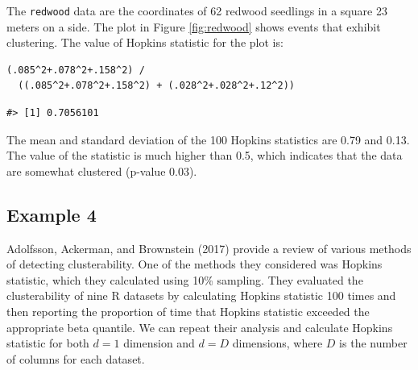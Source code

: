 The \texttt{redwood} data are the coordinates of 62 redwood seedlings in a square 23 meters on a side. The plot in Figure \ref{fig:redwood} shows events that exhibit clustering. The value of Hopkins statistic for the plot is:

\begin{verbatim}
(.085^2+.078^2+.158^2) /
  ((.085^2+.078^2+.158^2) + (.028^2+.028^2+.12^2))
\end{verbatim}

\begin{verbatim}
#> [1] 0.7056101
\end{verbatim}

The mean and standard deviation of the 100 Hopkins statistics are 0.79 and 0.13. The value of the statistic is much higher than 0.5, which indicates that the data are somewhat clustered (p-value 0.03).

\hypertarget{example-4}{%
\subsection{Example 4}\label{example-4}}

Adolfsson, Ackerman, and Brownstein (2017) provide a review of various methods of detecting clusterability. One of the methods they considered was Hopkins statistic, which they calculated using 10\% sampling. They evaluated the clusterability of nine R datasets by calculating Hopkins statistic 100 times and then reporting the proportion of time that Hopkins statistic exceeded the appropriate beta quantile. We can repeat their analysis and calculate Hopkins statistic for both \(d=1\) dimension and \(d=D\) dimensions, where \(D\) is the number of columns for each dataset.

